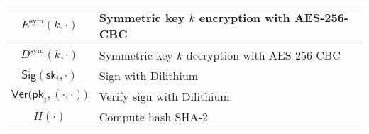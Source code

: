 \documentclass[conference]{IEEEtran}
\begin{document}
\begin{table}[t]
\begin{tabular}{cp{}}
        \hline
        $E^{\text{sym}}(k, \cdot)$ & Symmetric key $k$ encryption with AES-256-CBC \\
        \hline
        $D^{\text{sym}}(k, \cdot)$ & Symmetric key $k$ decryption with AES-256-CBC \\
        \hline
        $\mathsf{Sig}(\mathsf{sk}_i,\cdot)$ & Sign with Dilithium \\
        \hline
        $\mathsf{Ver}\bigl(\mathsf{pk}_i,(\cdot,\cdot)\bigr)$ & Verify sign with Dilithium \\
        \hline
        $H(\cdot)$ & Compute hash SHA-2 \\
        \hline
    \end{tabular}
    
\end{table}
\raggedbottom
\end{document}
